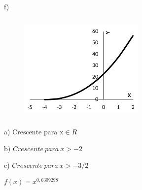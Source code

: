 \begin{respostas}{2}
~~

f)

	\begin{figure}[H]
		\begin{Center}
			\includegraphics[width=2.42in,height=2.11in]{capitulos/outras_funcoes/media/image39.pdf}
		\end{Center}
	\end{figure}


	\setcounter{enumi}{4}
	\ansitem{} a) \( \text{Crescente para x}  \in R  \)

	b) \( Crescente~para~x>-2 \) \quad 

	c)  \( Crescente~para~x>-3/2 \) 

	\ansitem{} \( f \left( x \right) =x^{0,6309298} \)  

\end{respostas}

